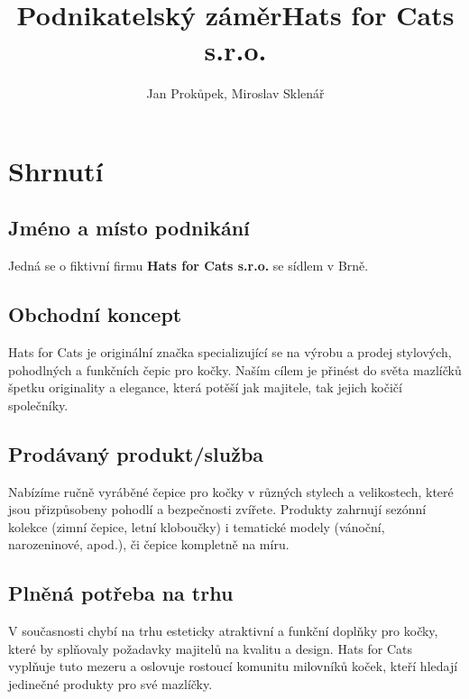 \documentclass[12pt, a4paper]{article}
\begin{document}
\nocite{csob-podnikatelsky-plan}
\nocite{pz-idoklad}
\author{Jan Prokůpek, Miroslav Sklenář}
\title{\textbf{Podnikatelský záměr}\break Hats for Cats s.r.o.}
\date{}

\maketitle

\pagebreak

\tableofcontents

\pagebreak

\section{Shrnutí}

\subsection{Jméno a místo podnikání}
Jedná se o fiktivní firmu \textbf{Hats for Cats s.r.o.} se sídlem v Brně.

\subsection{Obchodní koncept}
Hats for Cats je originální značka specializující se na výrobu a prodej stylových, pohodlných a funkčních čepic pro kočky. 
Naším cílem je přinést do světa mazlíčků špetku originality a elegance, která potěší jak majitele, tak jejich kočičí společníky.

\subsection{Prodávaný produkt/služba}
Nabízíme ručně vyráběné čepice pro kočky v různých stylech a velikostech, 
které jsou přizpůsobeny pohodlí a bezpečnosti zvířete. 
Produkty zahrnují sezónní kolekce (zimní čepice, letní kloboučky) i tematické modely (vánoční, narozeninové, apod.),
či čepice kompletně na míru.

\subsection{Plněná potřeba na trhu}
V současnosti chybí na trhu esteticky atraktivní a funkční doplňky pro kočky, které by splňovaly požadavky majitelů na kvalitu a design. Hats for Cats vyplňuje tuto mezeru a oslovuje rostoucí komunitu milovníků koček, kteří hledají jedinečné produkty pro své mazlíčky.
\end{document}
